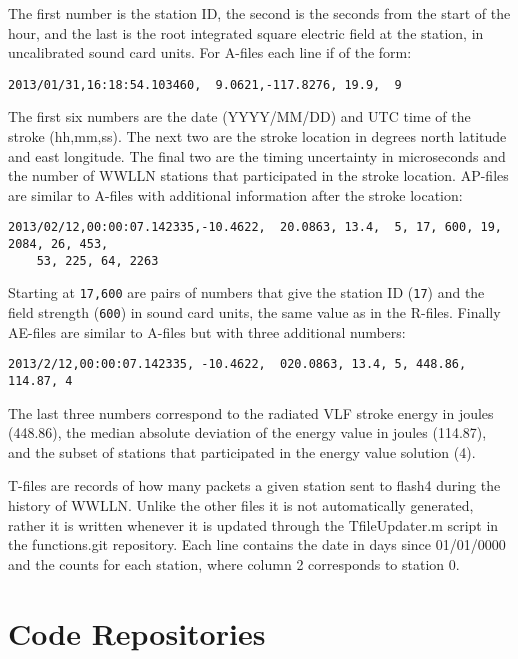 The first number is the station ID, the second is the seconds from the start of the hour, and the last is the root integrated square electric field at the station, in uncalibrated sound card units.
For A-files each line if of the form:

\begin{verbatim}
2013/01/31,16:18:54.103460,  9.0621,-117.8276, 19.9,  9
\end{verbatim}

The first six numbers are the date (YYYY/MM/DD) and UTC time of the stroke (hh,mm,ss).
The next two are the stroke location in degrees north latitude and east longitude.
The final two are the timing uncertainty in microseconds and the number of WWLLN stations that participated in the stroke location.
AP-files are similar to A-files with additional information after the stroke location:

\begin{verbatim}
2013/02/12,00:00:07.142335,-10.4622,  20.0863, 13.4,  5, 17, 600, 19, 2084, 26, 453, 
	53, 225, 64, 2263
\end{verbatim}

Starting at \verb|17,600| are pairs of numbers that give the station ID (\verb|17|) and the field strength (\verb|600|) in sound card units, the same value as in the R-files. Finally AE-files are similar to A-files but with three additional numbers:

\begin{verbatim}
2013/2/12,00:00:07.142335, -10.4622,  020.0863, 13.4, 5, 448.86, 114.87, 4
\end{verbatim}

The last three numbers correspond to the radiated VLF stroke energy in joules (448.86), the median absolute deviation of the energy value in joules (114.87), and the subset of stations that participated in the energy value solution (4).

T-files are records of how many packets a given station sent to flash4 during the history of WWLLN.
Unlike the other files it is not automatically generated, rather it is written whenever it is updated through the TfileUpdater.m script in the functions.git repository.
Each line contains the date in days since 01/01/0000 and the counts for each station, where column 2 corresponds to station 0.

\section{Code Repositories}

